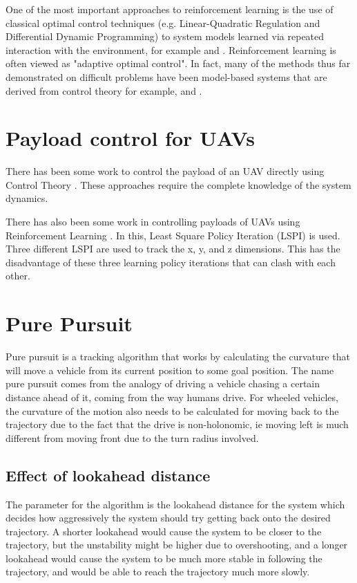 \documentclass[hidelinks,BTech]{iitmdiss}
\begin{document}
One of the most important approaches to reinforcement learning is the use of classical optimal control techniques (e.g. Linear-Quadratic Regulation and Differential Dynamic Programming) to system models learned via repeated interaction with the environment, for example \cite{NonparametricRL} and \cite{HelicopterPolicySearch}. Reinforcement learning is often viewed as "adaptive optimal control".  In fact, many of the methods thus far demonstrated on difficult problems have been model-based systems that are derived from control theory for example, \cite{LWL} and \cite{PILCO}.
 
\section{Payload control for UAVs}
There has been some work to control the payload of an UAV directly using Control Theory \cite{PayloadControlTheory,PayloadControlTheory2}. These approaches require the complete knowledge of the system dynamics.  

There has also been some work in controlling payloads of UAVs using Reinforcement Learning \cite{PayloadLSPI}. In this, Least Square Policy Iteration (LSPI) is used. Three different LSPI are used to track the x, y, and z dimensions. This has the disadvantage of these three learning policy iterations that can clash with each other.

\section{Pure Pursuit}
Pure pursuit\cite{PurePursuit} is a tracking algorithm that works by calculating the curvature that will move a vehicle from its current position to some goal position. The name pure pursuit comes from the analogy of driving a vehicle chasing a certain distance ahead of it, coming from the way humans drive. For wheeled vehicles, the curvature of the motion also needs to be calculated for moving back to the trajectory due to the fact that the drive is non-holonomic, ie moving left is much different from moving front due to the turn radius involved.

\subsection*{Effect of lookahead distance}
The parameter for the algorithm is the lookahead distance for the system which decides how aggressively the system should try getting back onto the desired trajectory. A shorter lookahead would cause the system to be closer to the trajectory, but the unstability might be higher due to overshooting, and a longer lookahead would cause the system to be much more stable in following the trajectory, and would be able to reach the trajectory much more slowly.
\end{document}
